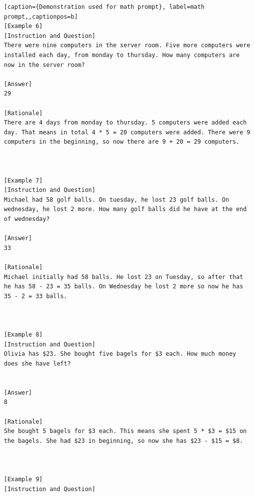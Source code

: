 \begin{lstlisting}[caption={Demonstration used for math prompt}, label=math prompt,,captionpos=b]
[Example 6]
[Instruction and Question] 
There were nine computers in the server room. Five more computers were installed each day, from monday to thursday. How many computers are now in the server room?

[Answer] 
29

[Rationale]
There are 4 days from monday to thursday. 5 computers were added each day. That means in total 4 * 5 = 20 computers were added. There were 9 computers in the beginning, so now there are 9 + 20 = 29 computers. 



[Example 7]
[Instruction and Question] 
Michael had 58 golf balls. On tuesday, he lost 23 golf balls. On wednesday, he lost 2 more. How many golf balls did he have at the end of wednesday?

[Answer] 
33

[Rationale]
Michael initially had 58 balls. He lost 23 on Tuesday, so after that he has 58 - 23 = 35 balls. On Wednesday he lost 2 more so now he has 35 - 2 = 33 balls. 



[Example 8]
[Instruction and Question] 
Olivia has $23. She bought five bagels for $3 each. How much money does she have left?


[Answer] 
8

[Rationale]
She bought 5 bagels for $3 each. This means she spent 5 * $3 = $15 on the bagels. She had $23 in beginning, so now she has $23 - $15 = $8. 



[Example 9]
[Instruction and Question]

    \end{lstlisting}
    




